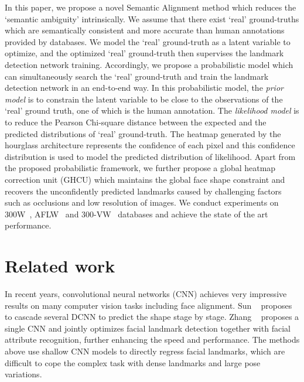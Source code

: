 \documentclass[10pt,twocolumn,letterpaper]{article}
\begin{document}
In this paper, we propose a novel Semantic Alignment method which reduces the `semantic ambiguity'  
intrinsically. We assume that there exist  `real' ground-truths which are semantically
consistent and more accurate than human annotations provided by databases.
We model the `real' ground-truth as a latent variable to optimize, and the optimized `real' ground-truth then supervises the landmark detection network training. 
Accordingly, we propose a probabilistic model which can simultaneously search the `real' ground-truth and train the landmark detection network in an end-to-end way. 
In this  probabilistic model, {the \emph{prior model} is to constrain the latent variable to be close to the observations of the `real' ground truth, one of which is the human annotation.} 
The \emph{likelihood model} is to reduce the Pearson Chi-square distance between the expected and the predicted distributions of `real' ground-truth. 
{The heatmap generated by the hourglass architecture \cite{newell2016stacked} represents the confidence 
	of each pixel and this confidence distribution is used to model the predicted distribution of likelihood.}
Apart from the proposed probabilistic framework, {we further propose a global heatmap correction unit (GHCU) which maintains the global face shape constraint and recovers the unconfidently predicted landmarks caused by challenging factors such as occlusions and low resolution of images.}
We conduct experiments on 300W~\cite{Sagonas2013A}, 
AFLW~\cite{koestinger2011annotated} and 300-VW~\cite{shen2015first, tzimiropoulos2015project, chrysos2015offline}
databases and achieve the state of the art performance.




\section{Related work} 

In recent years, convolutional neural networks (CNN) achieves very impressive results on many computer vision tasks including face alignment. Sun ~\cite{Sun2013Deep} proposes to cascade several DCNN to predict the shape stage by stage. Zhang ~\cite{Zhang2014Facial} proposes a single CNN and jointly optimizes facial landmark detection together with facial attribute recognition,  further enhancing the speed and performance. 
The methods above use 
{shallow}
CNN models to directly regress facial landmarks, which are difficult to cope the complex task with dense landmarks and large pose variations. 
\end{document}
